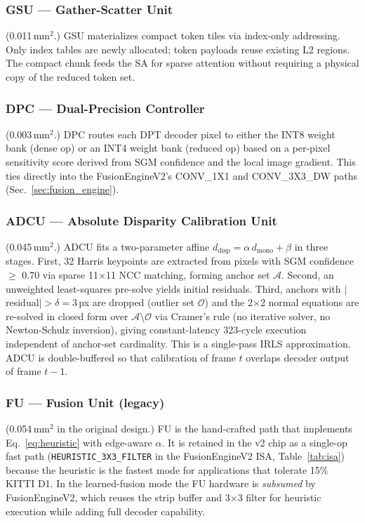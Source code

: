 \documentclass[journal]{IEEEtran}
\begin{document}
\subsubsection{GSU --- Gather-Scatter Unit}
(0.011\,mm$^2$.) GSU materializes compact token tiles via index-only addressing. Only index tables are newly allocated; token payloads reuse existing L2 regions. The compact chunk feeds the SA for sparse attention without requiring a physical copy of the reduced token set.

\subsubsection{DPC --- Dual-Precision Controller}
(0.003\,mm$^2$.) DPC routes each DPT decoder pixel to either the INT8 weight bank (dense op) or an INT4 weight bank (reduced op) based on a per-pixel sensitivity score derived from SGM confidence and the local image gradient. This ties directly into the FusionEngineV2's CONV\_1X1 and CONV\_3X3\_DW paths (Sec.~\ref{sec:fusion_engine}).

\subsubsection{ADCU --- Absolute Disparity Calibration Unit}
(0.045\,mm$^2$.) ADCU fits a two-parameter affine $d_{\text{disp}} = \alpha\,d_{\text{mono}} + \beta$ in three stages. First, 32 Harris keypoints are extracted from pixels with SGM confidence $\geq$ 0.70 via sparse 11$\times$11 NCC matching, forming anchor set $\mathcal{A}$. Second, an unweighted least-squares pre-solve yields initial residuals. Third, anchors with $|$residual$|>\delta{=}3$\,px are dropped (outlier set $\mathcal{O}$) and the 2$\times$2 normal equations are re-solved in closed form over $\mathcal{A}\setminus\mathcal{O}$ via Cramer's rule (no iterative solver, no Newton-Schulz inversion), giving constant-latency 323-cycle execution independent of anchor-set cardinality. This is a single-pass IRLS approximation. ADCU is double-buffered so that calibration of frame $t$ overlaps decoder output of frame $t-1$.

\subsubsection{FU --- Fusion Unit (legacy)}
(0.054\,mm$^2$ in the original design.) FU is the hand-crafted path that implements Eq.~\ref{eq:heuristic} with edge-aware $\alpha$. It is retained in the v2 chip as a single-op fast path (\texttt{HEURISTIC\_3X3\_FILTER} in the FusionEngineV2 ISA, Table~\ref{tab:isa}) because the heuristic is the fastest mode for applications that tolerate 15\% KITTI D1. In the learned-fusion mode the FU hardware is \emph{subsumed} by FusionEngineV2, which reuses the strip buffer and 3$\times$3 filter for heuristic execution while adding full decoder capability.
\end{document}
